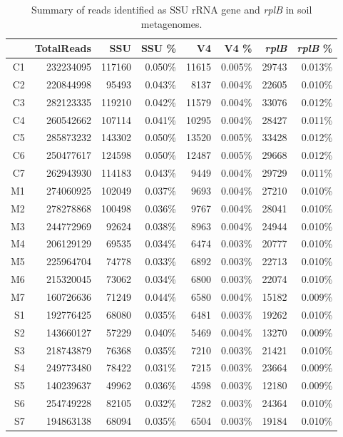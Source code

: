 \documentclass[]{msu-thesis}
\begin{document}
\begin{table}[htbp]
  \centering
  \caption[Summary of reads identified as SSU rRNA gene and \textit{\textit{rplB}} in soil metagenomes]{Summary of reads identified as SSU rRNA gene and \textit{\textit{rplB}} in soil metagenomes.}
    \begin{tabular}{|rrrrrrrr|}
    \toprule
          & TotalReads & SSU   & SSU \% & V4    & V4 \% & \textit{rplB}  & \textit{rplB} \% \\
    \midrule
    C1    & 232234095 & 117160 & 0.050\% & 11615 & 0.005\% & 29743 & 0.013\% \\
    C2    & 220844998 & 95493 & 0.043\% & 8137  & 0.004\% & 22605 & 0.010\% \\
    C3    & 282123335 & 119210 & 0.042\% & 11579 & 0.004\% & 33076 & 0.012\% \\
    C4    & 260542662 & 107114 & 0.041\% & 10295 & 0.004\% & 28427 & 0.011\% \\
    C5    & 285873232 & 143302 & 0.050\% & 13520 & 0.005\% & 33428 & 0.012\% \\
    C6    & 250477617 & 124598 & 0.050\% & 12487 & 0.005\% & 29668 & 0.012\% \\
    C7    & 262943930 & 114183 & 0.043\% & 9449  & 0.004\% & 29729 & 0.011\% \\
    M1    & 274060925 & 102049 & 0.037\% & 9693  & 0.004\% & 27210 & 0.010\% \\
    M2    & 278278868 & 100498 & 0.036\% & 9767  & 0.004\% & 28041 & 0.010\% \\
    M3    & 244772969 & 92624 & 0.038\% & 8963  & 0.004\% & 24944 & 0.010\% \\
    M4    & 206129129 & 69535 & 0.034\% & 6474  & 0.003\% & 20777 & 0.010\% \\
    M5    & 225964704 & 74778 & 0.033\% & 6892  & 0.003\% & 22713 & 0.010\% \\
    M6    & 215320045 & 73062 & 0.034\% & 6800  & 0.003\% & 22074 & 0.010\% \\
    M7    & 160726636 & 71249 & 0.044\% & 6580  & 0.004\% & 15182 & 0.009\% \\
    S1    & 192776425 & 68080 & 0.035\% & 6481  & 0.003\% & 19262 & 0.010\% \\
    S2    & 143660127 & 57229 & 0.040\% & 5469  & 0.004\% & 13270 & 0.009\% \\
    S3    & 218743879 & 76368 & 0.035\% & 7210  & 0.003\% & 21421 & 0.010\% \\
    S4    & 249773480 & 78422 & 0.031\% & 7215  & 0.003\% & 23664 & 0.009\% \\
    S5    & 140239637 & 49962 & 0.036\% & 4598  & 0.003\% & 12180 & 0.009\% \\
    S6    & 254749228 & 82105 & 0.032\% & 7282  & 0.003\% & 24364 & 0.010\% \\
    S7    & 194863138 & 68094 & 0.035\% & 6504  & 0.003\% & 19184 & 0.010\% \\
    \bottomrule
    \end{tabular}%
  \label{tab:S3}%
\end{table}%
\end{document}
